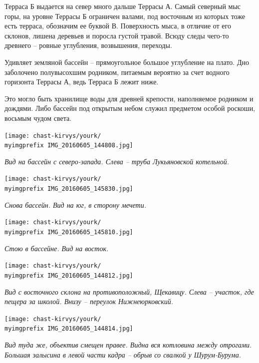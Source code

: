 Терраса Б выдается на север много дальше Террасы А. Самый северный мыс горы, на уровне Террасы Б ограничен валами, под восточным из которых тоже есть терраса, обозначим ее буквой В. Поверхность мыса, в отличие от его склонов, лишена деревьев и поросла густой травой. Всюду следы чего-то древнего – ровные углубления, возвышения, переходы.

Удивляет земляной бассейн – прямоугольное большое углубление на плато. Дно заболочено полувысохшим родником, питаемым вероятно за счет водного горизонта Террасы А, ведь Терраса Б лежит ниже.

Это могло быть хранилище воды для древней крепости, наполняемое родником и дождями. Либо бассейн под открытым небом служил предметом особой роскоши, восьмым чудом света. 

\begin{center}
\texttt{[image: chast-kirvys/yourk/\\myimgprefix IMG\_20160605\_144808.jpg]}

\textit{Вид на бассейн с северо-запада. Слева – труба Лукьяновской котельной.}
\end{center}

\begin{center}
\texttt{[image: chast-kirvys/yourk/\\myimgprefix IMG\_20160605\_145830.jpg]}

\textit{Снова бассейн. Вид на юг, в сторону мечети.}
\end{center}

\begin{center}
\texttt{[image: chast-kirvys/yourk/\\myimgprefix IMG\_20160605\_145810.jpg]}

\textit{Стою в бассейне. Вид на восток.}
\end{center}

\newpage

\begin{center}
\texttt{[image: chast-kirvys/yourk/\\myimgprefix IMG\_20160605\_144812.jpg]}

\textit{Вид с восточного склона на противоположный, Щекавицу. Слева – участок, где пещера за школой. Внизу – переулок Нижнеюрковский.}
\end{center}

\begin{center}
\texttt{[image: chast-kirvys/yourk/\\myimgprefix IMG\_20160605\_144814.jpg]}

\textit{Вид туда же, объектив смещен правее. Видна вся котловина между отрогами. Большая залысина в левой части кадра – обрыв со свалкой у Шурум-Бурума.}
\end{center}

